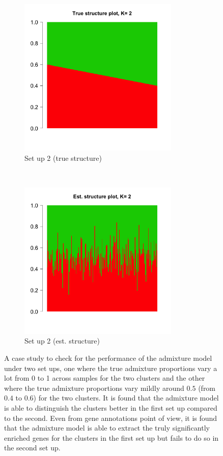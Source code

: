 \begin{figure}[ht]
    \begin{subfigure}[t]{0.5\textwidth}
        \centering
        \includegraphics[height=3in]{../plots/true_structure_setup_2.png}
        \caption{Set up 2 (true structure)}
    \end{subfigure}%
    ~ 
    \begin{subfigure}[t]{0.5\textwidth}
        \centering
        \includegraphics[height=3in]{../plots/est_structure_setup_2.png}
        \caption{Set up 2 (est. structure)}
    \end{subfigure} 
    \caption{A case study to check for the performance of the admixture model under two set ups, one where the true admixture proportions vary a lot from 0 to 1 across samples for the two clusters and the other where the true admixture proportions vary mildly around $0.5$ (from $0.4$ to $0.6$) for the two clusters. It is found that the admixture model is able to distinguish the clusters better in the first set up compared to the second. Even from gene annotations point of view, it is found that the admixture model is able to extract the truly significantly enriched genes for the clusters in the first set up but fails to do so in the second set up.}
 \end{figure}
 
